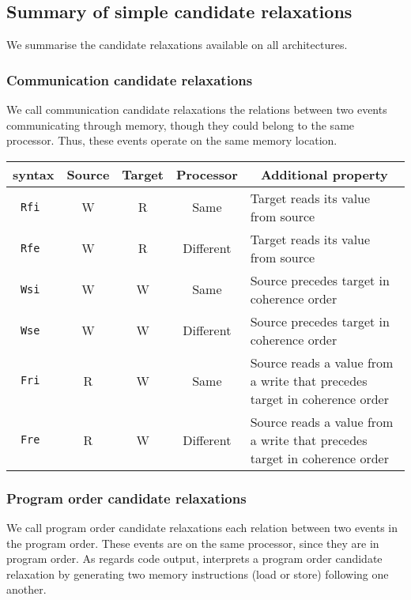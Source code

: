 \subsection{Summary of simple candidate relaxations}
We summarise the candidate relaxations available on all architectures.

\subsubsection{Communication\label{communication:cr} candidate relaxations}
We call communication candidate relaxations the relations between two events
communicating through memory, though they could belong to the same processor.
Thus, these events operate on the same memory location.
\begin{center}
\begin{tabular}{c|c|c|c|p{.4\linewidth}}
\diy{} syntax & Source & Target & Processor &
\multicolumn{1}{c}{Additional property}
\\\hline
\tt Rfi      & W      & R      & Same      &
Target reads its value from source \\\hline
\tt Rfe      & W      & R      & Different &
Target reads its value from source  \\\hline
\tt Wsi      & W      & W      & Same      &
Source precedes target in coherence order
\\\hline
\tt Wse      & W      & W      & Different &
Source precedes target in coherence order \\\hline
\tt Fri     & R      & W      & Same      &
Source reads a value from a write that precedes target in coherence order
  \\\hline
\tt Fre  & R      & W      & Different &
Source reads a value from a write that precedes target in coherence order
\\\hline
\end{tabular}
\end{center}


\subsubsection{Program order candidate relaxations}

We call program order candidate relaxations each relation
between two events in the
program order. These events are on the same processor, since they are in
program order.
As regards code output,
\diy{} interprets a program order candidate relaxation by generating
two memory instructions (load or store) following one another.

